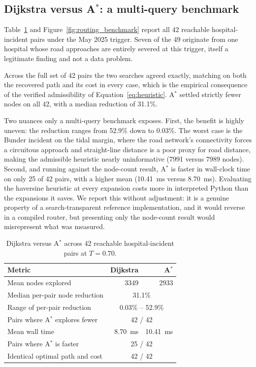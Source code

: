 \documentclass[11pt,a4paper]{article}
\begin{document}
\subsection{Dijkstra versus A$^\ast$: a multi-query benchmark}
\label{sec:res-algo}

Table~\ref{tab:algo} and Figure~\ref{fig:routing_benchmark} report all 42
reachable hospital-incident pairs under the May 2025 trigger. Seven of the 49
originate from one hospital whose road approaches are entirely severed at this
trigger, itself a legitimate finding and not a data problem.

Across the full set of 42 pairs the two searches agreed exactly, matching on both
the recovered path and its cost in every case, which is the empirical consequence
of the verified admissibility of Equation~\eqref{eq:heuristic}. A$^\ast$ settled
strictly fewer nodes on all 42, with a median reduction of 31.1\%.

Two nuances only a multi-query benchmark exposes. First, the benefit is highly
uneven: the reduction ranges from 52.9\% down to 0.03\%. The worst case is the
Bunder incident on the tidal margin, where the road network's connectivity forces
a circuitous approach and straight-line distance is a poor proxy for road
distance, making the admissible heuristic nearly uninformative (\num{7991} versus
\num{7989} nodes). Second, and running against the node-count result, A$^\ast$ is
faster in wall-clock time on only 25 of 42 pairs, with a higher mean
(\SI{10.41}{\milli\second} versus \SI{8.70}{\milli\second}). Evaluating the
haversine heuristic at every expansion costs more in interpreted Python than the
expansions it saves. We report this without adjustment: it is a genuine property
of a search-transparent reference implementation, and it would reverse in a
compiled router, but presenting only the node-count result would misrepresent
what was measured.

\begin{table}[t]
\centering
\caption{Dijkstra versus A$^\ast$ across 42 reachable hospital-incident pairs at
$T=0.70$.}
\label{tab:algo}
\small
\begin{tabular}{@{}lrr@{}}
\toprule
\textbf{Metric} & \textbf{Dijkstra} & \textbf{A}$^\ast$ \\
\midrule
Mean nodes explored & \num{3349} & \num{2933} \\
Median per-pair node reduction & \multicolumn{2}{c}{31.1\%} \\
Range of per-pair reduction & \multicolumn{2}{c}{0.03\% -- 52.9\%} \\
Pairs where A$^\ast$ explores fewer & \multicolumn{2}{c}{42 / 42} \\
Mean wall time & \SI{8.70}{\milli\second} & \SI{10.41}{\milli\second} \\
Pairs where A$^\ast$ is faster & \multicolumn{2}{c}{25 / 42} \\
Identical optimal path and cost & \multicolumn{2}{c}{42 / 42} \\
\bottomrule
\end{tabular}
\end{table}
\end{document}

